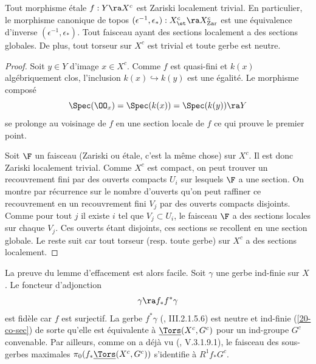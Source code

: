 \documentclass[10pt]{../fichiers-configuration-latex/smfart}
\begin{document}
\begin{lemme2}\label{20-co-sec} Tout morphisme étale $f:Y\ra X^c$ est Zariski localement trivial.
En particulier, le morphisme canonique de topos $(\epsilon^{-1},\epsilon_*): X^c_\et\ra
X^c_{\textup{Zar}}$ est une équivalence d'inverse $(\epsilon^{-1},\epsilon_*)$. Tout faisceau ayant
des sections localement a des sections globales. De plus, tout torseur sur $X^c$ est trivial et
toute gerbe est neutre.\end{lemme2}

\begin{proof} Soit $y\in Y$ d'image $x\in X^c$. Comme $f$ est quasi-fini et $k(x)$ algébriquement
clos, l'inclusion $k(x)\hookrightarrow k(y)$ est une égalité. Le morphisme composé
$$\Spec(\OO_x)=\Spec(k(x))=\Spec(k(y))\ra Y$$ se prolonge au voisinage de $f$ en une section locale
de $f$ ce qui prouve le premier point.

Soit $\F$ un faisceau (Zariski ou étale, c'est la même chose) sur $X^c$. Il est donc Zariski
localement trivial. Comme $X^c$ est compact, on peut trouver un recouvrement fini par des ouverts
compacts $U_i$ sur lesquels $\F$ a une section. On montre par récurrence sur le nombre d'ouverts
qu'on peut raffiner ce recouvrement en un recouvrement fini $V_j$ par des ouverts compacts
disjoints. Comme pour tout $j$ il existe $i$ tel que $V_j\subset U_i$, le faisceau $\F$ a des
sections locales sur chaque $V_j$. Ces ouverts étant disjoints, ces sections se recollent en une
section globale. Le reste suit car tout torseur (resp. toute gerbe) sur $X^c$ a des sections
localement.\end{proof}

La preuve du lemme d'effacement est alors facile. Soit $\gamma$ une gerbe ind-finie sur $X$. Le
foncteur d'adjonction $$\gamma\ra f_*f^* \gamma$$ est fidèle car $f$ est surjectif. La gerbe
$f^*\gamma$ (\cite{CNA@Giraud}, III.2.1.5.6) est neutre et ind-finie (\ref{20-co-sec}) de sorte
qu'elle est équivalente à $\underline{\Tors}(X^c,G^c)$ pour un ind-groupe $G^c$ convenable. Par
ailleurs, comme on a déjà vu (\cite{CNA@Giraud}, V.3.1.9.1), le faisceau des sous-gerbes maximales
$\pi_0(f_*\underline{\Tors}(X^c,G^c))$ s'identifie à $R^1f_*G^c$.
\end{document}
